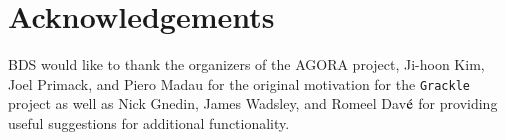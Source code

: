 \section*{Acknowledgements}

BDS would like to thank the organizers of the AGORA project, Ji-hoon
Kim, Joel Primack, and Piero Madau for the original motivation for the
\texttt{Grackle} project as well as Nick Gnedin, James Wadsley, and
Romeel Dav$\acute{\rm e}$ for providing useful suggestions for
additional functionality.
